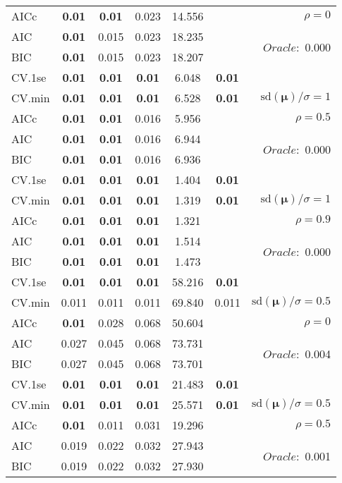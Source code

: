 \begin{table}
\begin{center}
\begin{tabular}{l*{5}{c}|r}
AICc & {\bf 0.01} & {\bf 0.01} & 0.023 & 14.556 & & $\rho=0$ \\
AIC & {\bf 0.01} & 0.015 & 0.023 & 18.235 & &  \multirow{2}{*}{$Oracle: $ 0.000} \\
BIC & {\bf 0.01} & 0.015 & 0.023 & 18.207 & &  \\
 \hline 
CV.1se & {\bf 0.01} & {\bf 0.01} & {\bf 0.01} & 6.048 & {\bf 0.01} & \\
CV.min & {\bf 0.01} & {\bf 0.01} & {\bf 0.01} & 6.528 & {\bf 0.01} &  $\mathrm{sd}(\mathbf{\mu})/\sigma=1$ \\
AICc & {\bf 0.01} & {\bf 0.01} & 0.016 & 5.956 & & $\rho=0.5$ \\
AIC & {\bf 0.01} & {\bf 0.01} & 0.016 & 6.944 & &  \multirow{2}{*}{$Oracle: $ 0.000} \\
BIC & {\bf 0.01} & {\bf 0.01} & 0.016 & 6.936 & &  \\
 \hline 
CV.1se & {\bf 0.01} & {\bf 0.01} & {\bf 0.01} & 1.404 & {\bf 0.01} & \\
CV.min & {\bf 0.01} & {\bf 0.01} & {\bf 0.01} & 1.319 & {\bf 0.01} &  $\mathrm{sd}(\mathbf{\mu})/\sigma=1$ \\
AICc & {\bf 0.01} & {\bf 0.01} & {\bf 0.01} & 1.321 & & $\rho=0.9$ \\
AIC & {\bf 0.01} & {\bf 0.01} & {\bf 0.01} & 1.514 & &  \multirow{2}{*}{$Oracle: $ 0.000} \\
BIC & {\bf 0.01} & {\bf 0.01} & {\bf 0.01} & 1.473 & &  \\
 \hline 
CV.1se & {\bf 0.01} & {\bf 0.01} & {\bf 0.01} & 58.216 & {\bf 0.01} & \\
CV.min & 0.011 & 0.011 & 0.011 & 69.840 & 0.011 &  $\mathrm{sd}(\mathbf{\mu})/\sigma=0.5$ \\
AICc & {\bf 0.01} & 0.028 & 0.068 & 50.604 & & $\rho=0$ \\
AIC & 0.027 & 0.045 & 0.068 & 73.731 & &  \multirow{2}{*}{$Oracle: $ 0.004} \\
BIC & 0.027 & 0.045 & 0.068 & 73.701 & &  \\
 \hline 
CV.1se & {\bf 0.01} & {\bf 0.01} & {\bf 0.01} & 21.483 & {\bf 0.01} & \\
CV.min & {\bf 0.01} & {\bf 0.01} & {\bf 0.01} & 25.571 & {\bf 0.01} &  $\mathrm{sd}(\mathbf{\mu})/\sigma=0.5$ \\
AICc & {\bf 0.01} & 0.011 & 0.031 & 19.296 & & $\rho=0.5$ \\
AIC & 0.019 & 0.022 & 0.032 & 27.943 & &  \multirow{2}{*}{$Oracle: $ 0.001} \\
BIC & 0.019 & 0.022 & 0.032 & 27.930 & &  \\

\end{tabular}
\end{center}
\end{table}
